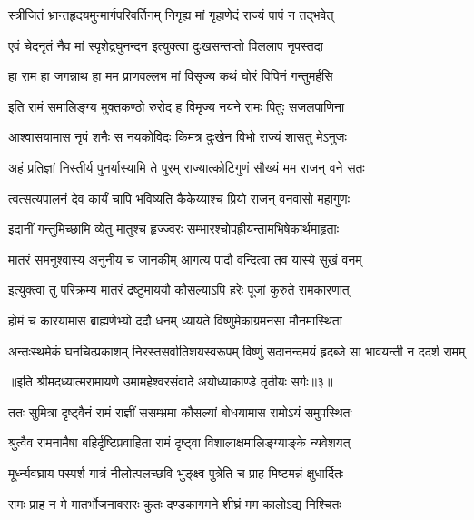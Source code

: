 \twolineshloka
{स्त्रीजितं भ्रान्तहृदयमुन्मार्गपरिवर्तिनम्}
{निगृह्य मां गृहाणेदं राज्यं पापं न तद्भवेत्} %

\twolineshloka
{एवं चेदनृतं नैव मां स्पृशेद्रघुनन्दन}
{इत्युक्त्वा दुःखसन्तप्तो विललाप नृपस्तदा} %

\twolineshloka
{हा राम हा जगन्नाथ हा मम प्राणवल्लभ}
{मां विसृज्य कथं घोरं विपिनं गन्तुमर्हसि} %

\twolineshloka
{इति रामं समालिङ्ग्य मुक्तकण्ठो रुरोद ह}
{विमृज्य नयने रामः पितुः सजलपाणिना} %

\twolineshloka
{आश्वासयामास नृपं शनैः स नयकोविदः}
{किमत्र दुःखेन विभो राज्यं शासतु मेऽनुजः} %

\twolineshloka
{अहं प्रतिज्ञां निस्तीर्य पुनर्यास्यामि ते पुरम्}
{राज्यात्कोटिगुणं सौख्यं मम राजन् वने सतः} %

\twolineshloka
{त्वत्सत्यपालनं देव कार्यं चापि भविष्यति}
{कैकेय्याश्च प्रियो राजन् वनवासो महागुणः} %

\twolineshloka
{इदानीं गन्तुमिच्छामि व्येतु मातुश्च हृज्ज्वरः}
{सम्भारश्चोपह्रीयन्तामभिषेकार्थमाहृताः} %

\twolineshloka
{मातरं समनुश्वास्य अनुनीय च जानकीम्}
{आगत्य पादौ वन्दित्वा तव यास्ये सुखं वनम्} %

\twolineshloka
{इत्युक्त्वा तु परिक्रम्य मातरं द्रष्टुमाययौ}
{कौसल्याऽपि हरेः पूजां कुरुते रामकारणात्} %

\twolineshloka
{होमं च कारयामास ब्राह्मणेभ्यो ददौ धनम्}
{ध्यायते विष्णुमेकाग्रमनसा मौनमास्थिता} %

\fourlineindentedshloka
{अन्तःस्थमेकं घनचित्प्रकाशम्}
{निरस्तसर्वातिशयस्वरूपम्}
{विष्णुं सदानन्दमयं हृदब्जे}
{सा भावयन्ती न ददर्श रामम्} %

{॥इति श्रीमदध्यात्मरामायणे उमामहेश्वरसंवादे
अयोध्याकाण्डे तृतीयः सर्गः॥३॥
}




\twolineshloka
{ततः सुमित्रा दृष्ट्वैनं रामं राज्ञीं ससम्भ्रमा}
{कौसल्यां बोधयामास रामोऽयं समुपस्थितः} %

\twolineshloka
{श्रुत्वैव रामनामैषा बहिर्दृष्टिप्रवाहिता}
{रामं दृष्ट्वा विशालाक्षमालिङ्ग्याङ्के न्यवेशयत्} %

\twolineshloka
{मूर्ध्न्यवघ्राय पस्पर्श गात्रं नीलोत्पलच्छवि}
{भुङ्क्ष्व पुत्रेति च प्राह मिष्टमन्नं क्षुधार्दितः} %

\twolineshloka
{रामः प्राह न मे मातर्भोजनावसरः कुतः}
{दण्डकागमने शीघ्रं मम कालोऽद्य निश्चितः} %

